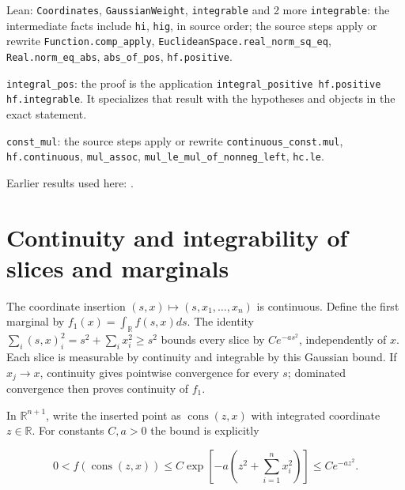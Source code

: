 \documentclass[11pt,a4paper]{article}
\begin{document}
\begin{leanbox}{Lean: \texttt{Coordinates}, \texttt{GaussianWeight}, \texttt{integrable} and 2 more}
\texttt{integrable}: the intermediate facts include \texttt{hi}, \texttt{hig}, in source order; the source steps apply or rewrite \texttt{Function.\allowbreak{}comp\_\allowbreak{}apply}, \texttt{Euclidean\allowbreak{}Space.\allowbreak{}real\_\allowbreak{}norm\_\allowbreak{}sq\_\allowbreak{}eq}, \texttt{Real.\allowbreak{}norm\_\allowbreak{}eq\_\allowbreak{}abs}, \texttt{abs\_\allowbreak{}of\_\allowbreak{}pos}, \texttt{hf.\allowbreak{}positive}.



\texttt{integral\_\allowbreak{}pos}: the proof is the application \texttt{integral\_\allowbreak{}positive hf.\allowbreak{}positive hf.\allowbreak{}integrable}. It specializes that result with the hypotheses and objects in the exact statement.



\texttt{const\_\allowbreak{}mul}: the source steps apply or rewrite \texttt{continuous\_\allowbreak{}const.\allowbreak{}mul}, \texttt{hf.\allowbreak{}continuous}, \texttt{mul\_\allowbreak{}assoc}, \texttt{mul\_\allowbreak{}le\_\allowbreak{}mul\_\allowbreak{}of\_\allowbreak{}nonneg\_\allowbreak{}left}, \texttt{hc.\allowbreak{}le}.
\end{leanbox}


Earlier results used here: \cite[Section~3.26.4]{LangevinLean2026ULASC}.

\section{\texorpdfstring{Continuity and integrability of slices and marginals}{Continuity and integrability of slices and marginals}}


The coordinate insertion \((s,x)\mapsto(s,x_1,\ldots,x_n)\) is continuous. Define the first marginal by \(f_1(x)=\int_\mathbb R f(s,x)ds\). The identity \(\sum_i(s,x)_i^2=s^2+\sum_i x_i^2\ge s^2\) bounds every slice by \(Ce^{-as^2}\), independently of \(x\). Each slice is measurable by continuity and integrable by this Gaussian bound. If \(x_j\to x\), continuity gives pointwise convergence for every \(s\); dominated convergence then proves continuity of \(f_1\).



In \(\mathbb R^{n+1}\), write the inserted point as \(\operatorname{cons}(z,x)\) with integrated coordinate \(z\in\mathbb R\). For constants \(C,a>0\) the bound is explicitly

\[0<f(\operatorname{cons}(z,x))\le C\exp\!\left[-a\left(z^2+\sum_{i=1}^{n}x_i^2\right)\right]\le C e^{-az^2}.\]
\end{document}
